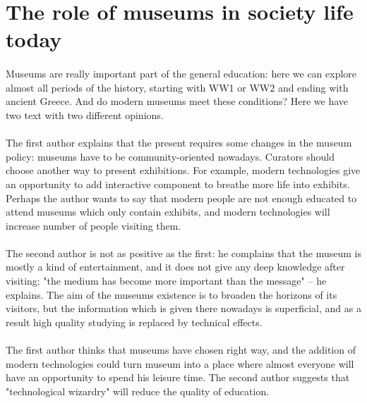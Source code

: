 \documentclass[14pt]{article}
\begin{document}
\large

\section*{The role of museums in society life today}
\paragraph{}
Museums are really important part of the general education: here we can explore 
almost all periods of the history, starting with WW1 or WW2 and ending with ancient Greece.
And do modern museums meet these conditions? Here we have two text with two different opinions.
\paragraph{}
The first author explains that the present requires some changes in the museum policy: museums 
have to be community-oriented nowadays. Curators should choose another way to present exhibitions. For example, modern technologies give an opportunity to add interactive component to breathe more life into exhibits. Perhaps the author wants to say that modern people are not enough educated to attend museums which only contain exhibits, and modern technologies will increase number of people visiting them.
\paragraph{}
The second author is not as positive as the first: he complains that the museum is mostly a kind of
entertainment, and it does not give any deep knowledge after visiting: "the medium has become more important than the message" -- he explains. The aim of the museums existence is to broaden the horizons of
its visitors, but the information which is given there nowadays is superficial, and as a result high quality studying
is replaced by technical effects.
\paragraph{}
The first author thinks that museums have chosen right way, and the addition of modern technologies could
turn museum into a place where almost everyone will have an opportunity to spend his leisure time.
The second author suggests that "technological wizardry" will reduce the quality of education.
\end{document}
